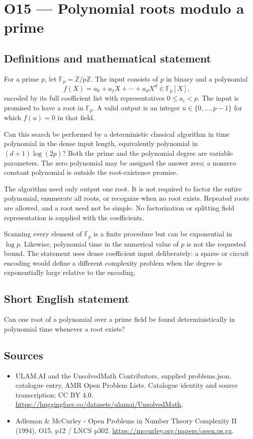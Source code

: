 \documentclass[11pt,a4paper]{article}
\begin{document}
\section*{O15 — Polynomial roots modulo a prime}\label{statement}

\subsection{Definitions and mathematical statement}
For a prime $p$, let $\mathbb F_p=\mathbb Z/p\mathbb Z$. The input consists of $p$ in binary and a polynomial
\[
f(X)=a_0+a_1X+\cdots+a_dX^d\in\mathbb F_p[X],
\]
encoded by its full coefficient list with representatives $0\le a_i<p$. The input is promised to have a root in $\mathbb F_p$. A valid output is an integer $u\in\{0,\ldots,p-1\}$ for which $f(u)=0$ in that field.

Can this search be performed by a deterministic classical algorithm in time polynomial in the dense input length, equivalently polynomial in $(d+1)\log(2p)$? Both the prime and the polynomial degree are variable parameters. The zero polynomial may be assigned the answer zero; a nonzero constant polynomial is outside the root-existence promise.

The algorithm need only output one root. It is not required to factor the entire polynomial, enumerate all roots, or recognize when no root exists. Repeated roots are allowed, and a root need not be simple. No factorization or splitting field representation is supplied with the coefficients.

Scanning every element of $\mathbb F_p$ is a finite procedure but can be exponential in $\log p$. Likewise, polynomial time in the numerical value of $p$ is not the requested bound. The statement uses dense coefficient input deliberately: a sparse or circuit encoding would define a different complexity problem when the degree is exponentially large relative to the encoding.
\subsection{Short English statement}
Can one root of a polynomial over a prime field be found deterministically in polynomial time whenever a root exists?
\subsection{Sources}
\begin{itemize}
\item[S1] ULAM.AI and the UnsolvedMath Contributors, supplied problems.json, catalogue entry, AMR Open Problem Lists. Catalogue identity and source transcription; CC BY 4.0.
\url{https://huggingface.co/datasets/ulamai/UnsolvedMath}.
\item[S2] Adleman \& McCurley - Open Problems in Number Theory Complexity II (1994), O15, p12 / LNCS p302. 
\url{https://mccurley.org/papers/open.ps.gz}.
\end{itemize}
\end{document}
